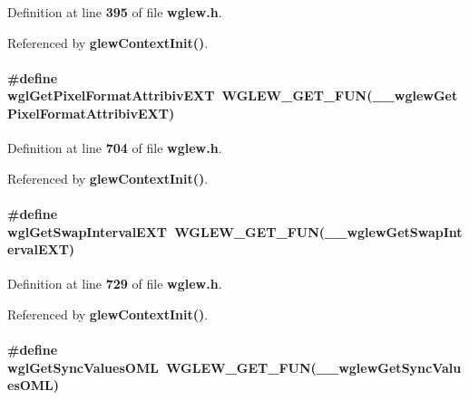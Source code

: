 Definition at line {\bf 395} of file {\bf wglew.\+h}.



Referenced by {\bf glew\+Context\+Init()}.

\paragraph[{wgl\+Get\+Pixel\+Format\+Attribiv\+E\+XT}]{\setlength{\rightskip}{0pt plus 5cm}\#define wgl\+Get\+Pixel\+Format\+Attribiv\+E\+XT~{\bf W\+G\+L\+E\+W\+\_\+\+G\+E\+T\+\_\+\+F\+UN}({\bf \+\_\+\+\_\+wglew\+Get\+Pixel\+Format\+Attribiv\+E\+XT})}\label{wglew_8h_ac46d0a6764f6887c3cbcaf38360aacd4}


Definition at line {\bf 704} of file {\bf wglew.\+h}.



Referenced by {\bf glew\+Context\+Init()}.

\paragraph[{wgl\+Get\+Swap\+Interval\+E\+XT}]{\setlength{\rightskip}{0pt plus 5cm}\#define wgl\+Get\+Swap\+Interval\+E\+XT~{\bf W\+G\+L\+E\+W\+\_\+\+G\+E\+T\+\_\+\+F\+UN}({\bf \+\_\+\+\_\+wglew\+Get\+Swap\+Interval\+E\+XT})}\label{wglew_8h_a7073e5f629ddd39067319f13e13f676e}


Definition at line {\bf 729} of file {\bf wglew.\+h}.



Referenced by {\bf glew\+Context\+Init()}.

\paragraph[{wgl\+Get\+Sync\+Values\+O\+ML}]{\setlength{\rightskip}{0pt plus 5cm}\#define wgl\+Get\+Sync\+Values\+O\+ML~{\bf W\+G\+L\+E\+W\+\_\+\+G\+E\+T\+\_\+\+F\+UN}({\bf \+\_\+\+\_\+wglew\+Get\+Sync\+Values\+O\+ML})}\label{wglew_8h_af41e690551053f96282a4a4fbe3ff374}


